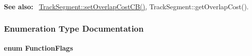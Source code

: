 {\bfseries See also\-:}~ \hyperlink{classKite_1_1TrackElement_a4648fa47d0870cf743436ff6a6239fd9}{Track\-Segment\-::set\-Overlap\-Cost\-C\-B()}, Track\-Segment\-::get\-Overlap\-Cost(). 

\subsubsection{Enumeration Type Documentation}
\hypertarget{namespaceKite_acca8fffa3182dea5f94208f454f14b47}{
\paragraph[{Function\-Flags}]{\setlength{\rightskip}{0pt plus 5cm}enum {\bf Function\-Flags}}}\label{namespaceKite_acca8fffa3182dea5f94208f454f14b47}
